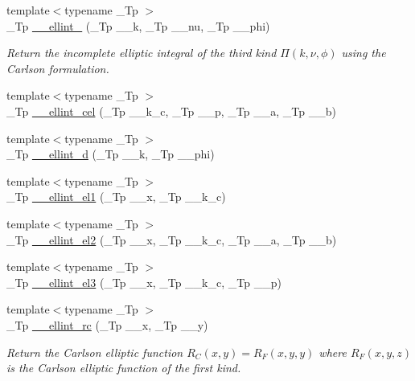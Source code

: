 \begin{DoxyCompactItemize}
{\footnotesize template$<$typename \+\_\+\+Tp $>$ }\\\+\_\+\+Tp \hyperlink{namespacestd_1_1____detail_a9c6ea96cd5d6907fce278010b992499a}{\+\_\+\+\_\+ellint\+\_} (\+\_\+\+Tp \+\_\+\+\_\+k, \+\_\+\+Tp \+\_\+\+\_\+nu, \+\_\+\+Tp \+\_\+\+\_\+phi)
\begin{DoxyCompactList}\small\item\em Return the incomplete elliptic integral of the third kind $ \Pi(k,\nu,\phi) $ using the Carlson formulation. \end{DoxyCompactList}\item 
{\footnotesize template$<$typename \+\_\+\+Tp $>$ }\\\+\_\+\+Tp \hyperlink{namespacestd_1_1____detail_a7c7d04715f0d40e054299312db35e32d}{\+\_\+\+\_\+ellint\+\_\+cel} (\+\_\+\+Tp \+\_\+\+\_\+k\+\_\+c, \+\_\+\+Tp \+\_\+\+\_\+p, \+\_\+\+Tp \+\_\+\+\_\+a, \+\_\+\+Tp \+\_\+\+\_\+b)
\item 
{\footnotesize template$<$typename \+\_\+\+Tp $>$ }\\\+\_\+\+Tp \hyperlink{namespacestd_1_1____detail_a00da42d89830fd51e9934fe0c5e08b7f}{\+\_\+\+\_\+ellint\+\_\+d} (\+\_\+\+Tp \+\_\+\+\_\+k, \+\_\+\+Tp \+\_\+\+\_\+phi)
\item 
{\footnotesize template$<$typename \+\_\+\+Tp $>$ }\\\+\_\+\+Tp \hyperlink{namespacestd_1_1____detail_aa17b1b382a89552f49fbb8c5eda1d50f}{\+\_\+\+\_\+ellint\+\_\+el1} (\+\_\+\+Tp \+\_\+\+\_\+x, \+\_\+\+Tp \+\_\+\+\_\+k\+\_\+c)
\item 
{\footnotesize template$<$typename \+\_\+\+Tp $>$ }\\\+\_\+\+Tp \hyperlink{namespacestd_1_1____detail_a82449d0f05d40ba2cef6b8fc57dd5bae}{\+\_\+\+\_\+ellint\+\_\+el2} (\+\_\+\+Tp \+\_\+\+\_\+x, \+\_\+\+Tp \+\_\+\+\_\+k\+\_\+c, \+\_\+\+Tp \+\_\+\+\_\+a, \+\_\+\+Tp \+\_\+\+\_\+b)
\item 
{\footnotesize template$<$typename \+\_\+\+Tp $>$ }\\\+\_\+\+Tp \hyperlink{namespacestd_1_1____detail_a2a2b5b80edd39b3d1f852f10c5f277fc}{\+\_\+\+\_\+ellint\+\_\+el3} (\+\_\+\+Tp \+\_\+\+\_\+x, \+\_\+\+Tp \+\_\+\+\_\+k\+\_\+c, \+\_\+\+Tp \+\_\+\+\_\+p)
\item 
{\footnotesize template$<$typename \+\_\+\+Tp $>$ }\\\+\_\+\+Tp \hyperlink{namespacestd_1_1____detail_aa7d81e41240a6d031414c6b117889e36}{\+\_\+\+\_\+ellint\+\_\+rc} (\+\_\+\+Tp \+\_\+\+\_\+x, \+\_\+\+Tp \+\_\+\+\_\+y)
\begin{DoxyCompactList}\small\item\em Return the Carlson elliptic function $ R_C(x,y) = R_F(x,y,y) $ where $ R_F(x,y,z) $ is the Carlson elliptic function of the first kind. \end{DoxyCompactList}\item 

\end{DoxyCompactItemize}
